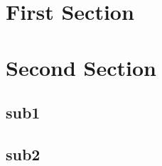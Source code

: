\documentclass[aspectratio=43]{beamer}
\begin{document}
\section{First Section}
\frame{} \frame{} \frame{}

\section{Second Section}

\subsection{sub1}
\frame{} \frame{} \frame{}

\subsection{sub2}
\frame{} \frame{} \frame{}
\end{document}
